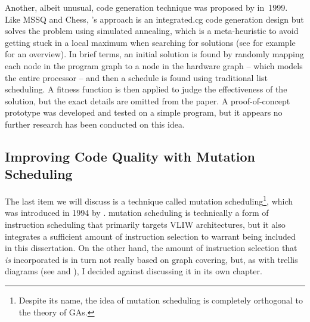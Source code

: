 Another, albeit unusual, \gls{code generation} technique was proposed by
\textcite{Visser1999} in~1999.
%
Like \gls{MSSQ} and \gls{Chess},
\citeauthor{Visser1999}'s approach is an \gls{integrated.cg} \gls{code
  generation} design but solves the problem using \gls{simulated annealing},
which is a meta-heuristic to avoid getting stuck in a local maximum when
searching for solutions (see for example \cite{Kirkpatrick1983} for an
overview).
%
In brief terms, an initial solution is found by randomly mapping each
\gls{node} in the \gls{program graph} to a \gls{node} in the hardware
\gls{graph} -- which models the entire processor -- and then a schedule is found
using traditional \gls{list scheduling}.
%
A fitness function is then applied to
judge the effectiveness of the solution, but the exact details are omitted from
the paper.
%
A proof-of-concept prototype was developed and tested on a simple
\gls{program}, but it appears no further research has been conducted on this
idea.


\subsection{Improving Code Quality with Mutation Scheduling}

The last item we will discuss is a technique called \gls{mutation
  scheduling}\footnote{Despite its name, the idea of \gls{mutation scheduling}
  is completely orthogonal to the theory of \glsdesc{GA}s.}, which was
introduced in 1994 by .
%
\Gls{mutation
  scheduling} is technically a form of \gls{instruction scheduling} that
primarily targets \gls{VLIW} architectures, but it also integrates a sufficient
amount of \gls{instruction selection} to warrant being included in this dissertation.
%
On
the other hand, the amount of \gls{instruction selection} that \emph{is}
incorporated is in turn not really based on \gls{graph covering}, but, as with
\glspl{trellis diagram} (see  and
), I decided against discussing it in its own
chapter.

